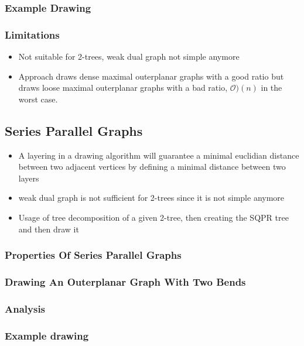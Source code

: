 \subsubsection{Example Drawing}


\subsubsection{Limitations}
\begin{itemize}
	\item Not suitable for 2-trees, weak dual graph not simple anymore
	\item Approach draws dense maximal outerplanar graphs with a good ratio but draws loose maximal outerplanar graphs with a bad ratio, $\mathcal{O})(n)$ in the worst case.
\end{itemize}

\subsection{Series Parallel Graphs}

\begin{itemize}
	\item A layering in a drawing algorithm will guarantee a minimal euclidian distance between two adjacent vertices by defining a minimal distance between two layers
	\item weak dual graph is not sufficient for 2-trees since it is not simple anymore
	\item Usage of tree decomposition of a given 2-tree, then creating the SQPR tree and then draw it
\end{itemize}

\subsubsection{Properties Of Series Parallel Graphs}

\subsubsection{Drawing An Outerplanar Graph With Two Bends}

\subsubsection{Analysis}

\subsubsection{Example drawing}

